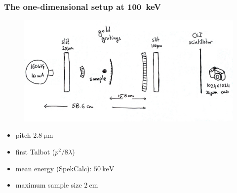 \documentclass[first,firstsupp]{ETHclass}
\begin{document}
    \begin{frame}
        \frametitle{The one-dimensional setup at
            \SI{100}{\kilo\electronvolt}}
        \begin{figure}[h]
            \centering
            \includegraphics[width=.6\textwidth]{setup.pdf}
        \end{figure}
        \begin{itemize}
            \item pitch $\SI{2.8}{\micro\metre}$
            \item first Talbot ($p^2/8\lambda$)
            \item mean energy (SpekCalc):
                $\SI{50}{\kilo\electronvolt}$
            \item maximum sample size $\SI{2}{\centi\metre}$
        \end{itemize}
    \end{frame}
\end{document}
